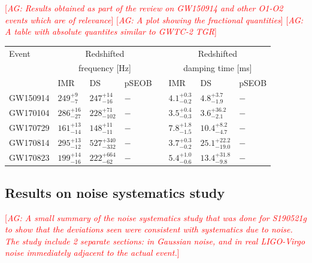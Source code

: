 \documentclass[twocolumn,prd,superscriptaddress,amsfonts,amssymb,amsmath,preprintnumbers]{revtex4-1}
\newcommand{\abhi}[1]{\textcolor{red}{[\textit{AG: #1}]}}
\begin{document}
\abhi{Results obtained as part of the review on GW150914 and other O1-O2 events which are of relevance}
\abhi{A plot showing the fractional quantities}
\abhi{A table with absolute quantites similar to GWTC-2 TGR}

\begin{tabular}{llllllll}
\toprule
Event & \multicolumn{3}{c}{Redshifted} & \hphantom{X} & \multicolumn{3}{c}{Redshifted} \\
& \multicolumn{3}{c}{frequency [Hz]} & \hphantom{X} & \multicolumn{3}{c}{damping time [ms]} \\[0.075cm]
\cline{2-4}
\cline{6-8}
& IMR & DS & pSEOB & \hphantom{X} & IMR & DS & pSEOB \\
\midrule

GW150914 &
$249^{+9}_{-7}$ &
$247^{+14}_{-16}$ &
$-$ &
\hphantom{X} &
$4.1^{+0.3}_{-0.2}$ &
$4.8^{+3.7}_{-1.9}$ &
$-$
\\[0.075cm]

GW170104 &
$286^{+16}_{-27}$ &
$228^{+71}_{-102}$ &
$-$ &
\hphantom{X} &
$3.5^{+0.4}_{-0.3}$ &
$3.6^{+36.2}_{-2.1}$ &
$-$
\\[0.075cm]

GW170729 &
$161^{+13}_{-14}$ &
$148^{+11}_{-11}$ &
$-$ &
\hphantom{X} &
$7.8^{+1.8}_{-1.5}$ &
$10.4^{+8.2}_{-4.7}$ &
$-$
\\[0.075cm]

GW170814 &
$295^{+13}_{-12}$ &
$527^{+340}_{-332}$ &
$-$ &
\hphantom{X} &
$3.7^{+0.3}_{-0.2}$ &
$25.1^{+22.2}_{-19.0}$ &
$-$
\\[0.075cm]

GW170823 &
$199^{+14}_{-16}$ &
$222^{+664}_{-62}$ &
$-$ &
\hphantom{X} &
$5.4^{+1.0}_{-0.6}$ &
$13.4^{+31.8}_{-9.8}$ &
$-$
\\[0.075cm]

\bottomrule
\end{tabular}


\subsection{Results on noise systematics study}

\abhi{A small summary of the noise systematics study that was done for S190521g to show that the deviations seen were consistent with systematics due to noise. The study include 2 separate sections: in Gaussian noise, and in real LIGO-Virgo noise immediately adjacent to the actual event.}

\end{document}
